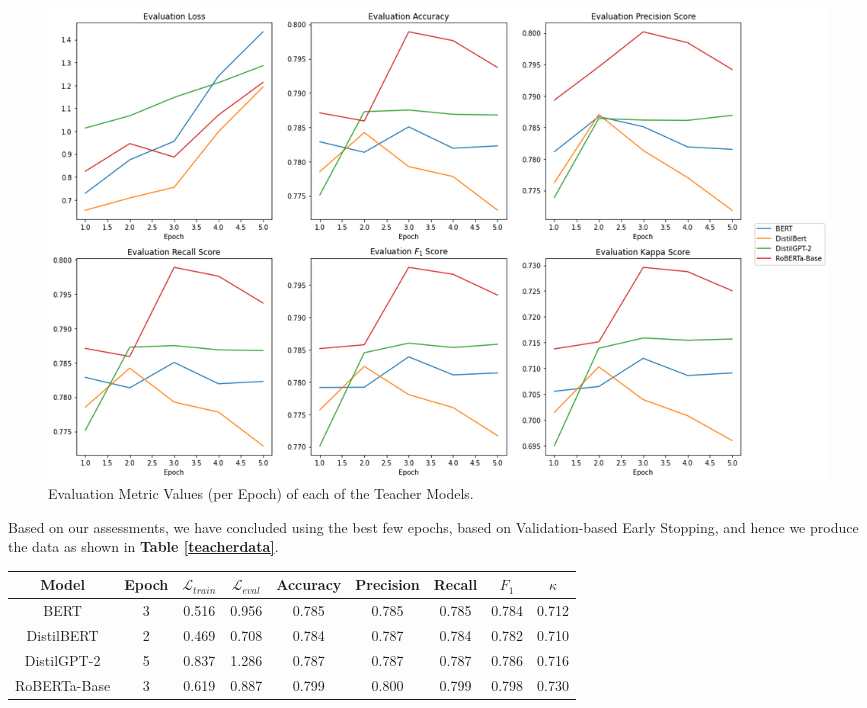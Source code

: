\documentclass[12pt]{article}
\begin{document}
{\begin{figure}[!h]
    \begin{center}
        \includegraphics[scale=0.39]{images/metrics.png}
        \caption{Evaluation Metric Values (per Epoch) of each of the Teacher Models.}
        \label{fig:evalTeacher}
    \end{center}
\end{figure}


Based on our assessments, we have concluded using the best few epochs, based on Validation-based Early Stopping, and hence we produce the data as shown in \textbf{Table \ref{teacherdata}}.

\begin{center}
\begin{tabular}{c c|c c c c c c c}
     Model & Epoch & $\mathcal{L}_{train}$ & $\mathcal{L}_{eval}$ & Accuracy & Precision & Recall & $F_1$ & $\kappa$ \\
     \hline BERT         &      3 &                  0.516 &                 0.956 &     0.785 &      0.785 &   0.785 &  0.784 &     0.712 \\
DistilBERT   &      2 &                  0.469 &                 0.708 &     0.784 &      0.787 &   0.784 &  0.782 &     0.710 \\
DistilGPT-2  &      5 &                  0.837 &                 1.286 &     0.787 &      0.787 &   0.787 &  0.786 &     0.716 \\
RoBERTa-Base &      3 &                  0.619 &                 0.887 &     0.799 &      0.800 &   0.799 &  0.798 &     0.730 \\
\end{tabular}
\label{teacherdata}
\end{center}

}
\end{document}
